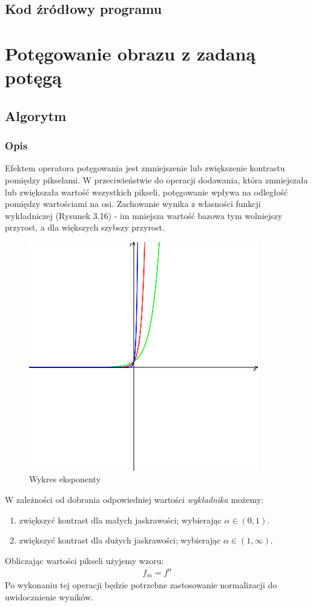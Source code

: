 \documentclass[a4paper,12pt]{book}
\begin{document}
\subsection*{Kod źródłowy programu}

\section{Potęgowanie obrazu z zadaną potęgą}
\subsection*{Algorytm}
\subsubsection*{Opis}
Efektem operatora potęgowania jest zmniejszenie lub zwiększenie kontrastu pomiędzy pikselami. W przeciwieństwie do operacji dodawania, która zmniejszała lub zwiększała wartość wszystkich pikseli, potęgowanie wpływa na odległość pomiędzy wartościami na osi. Zachowanie wynika z własności funkcji wykładniczej (Rysunek 3.16) - im mniejsza wartość bazowa tym wolniejszy przyrost, a dla większych szybszy przyrost. 
\begin{figure}[H]
	\caption{Wykres eksponenty}
	\includegraphics[width=10cm, height=10cm]{overview/exponential-curve.png}
\end{figure}
W zależności od dobrania odpowiedniej wartości \textit{wykładnika} możemy: 
\begin{enumerate}
	\item zwiększyć kontrast dla małych jaskrawości; wybierając $\alpha \in (0,1)$. 
	\item zwiększyć kontrast dla dużych jaskrawości; wybierając $\alpha \in (1,\infty)$. 
\end{enumerate}
Obliczając wartości pikseli użyjemy wzoru: 
\begin{gather}
	f_m = f^\alpha
\end{gather}
Po wykonaniu tej operacji będzie potrzebne zastosowanie normalizacji do uwidocznienie wyników. 
\end{document}
